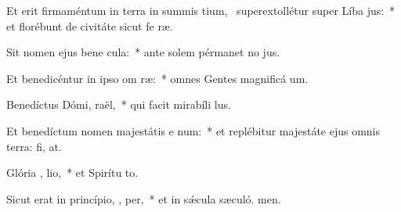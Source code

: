 \item Et erit firmaméntum in terra in summis tium,~\pscross{} superextollétur super Líba  jus:~* et florébunt de civitáte sicut fe ræ.
\item Sit nomen ejus bene  cula:~* ante solem pérmanet no jus.
\item Et benedicéntur in ipso om  ræ:~* omnes Gentes magnificá um.
\item Benedíctus Dómi,  raël,~* qui facit mirabíli lus.
\item Et benedíctum nomen majestátis e  num:~* et replébitur majestáte ejus omnis terra: fi, at.
\item Glória ,  lio,~* et Spirítu to.
\item Sicut erat in princípio,  ,  per,~* et in sǽcula sæculó. men.
